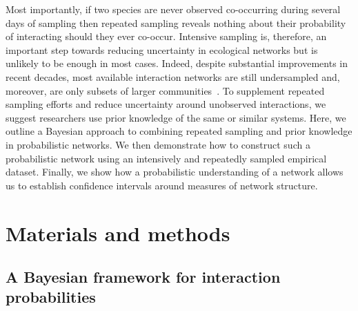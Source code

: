 \documentclass[12pt]{article}
\begin{document}
\begin{spacing}{2.0}
        Most importantly, if two species are never observed co-occurring during several days of sampling then repeated sampling reveals nothing about their probability of interacting should they ever co-occur. Intensive sampling is, therefore, an important step towards reducing uncertainty in ecological networks but is unlikely to be enough in most cases. 
        Indeed, despite substantial improvements in recent decades, most available interaction networks are still undersampled and, moreover, are only subsets of larger communities~\citep{Jordano2016}.
        To supplement repeated sampling efforts and reduce uncertainty around unobserved interactions, we suggest researchers use prior knowledge of the same or similar systems. Here, we outline a Bayesian approach to combining repeated sampling and prior knowledge in probabilistic networks. We then demonstrate how to construct such a probabilistic network using an intensively and repeatedly sampled empirical dataset. Finally, we show how a probabilistic understanding of a network allows us to establish confidence intervals around measures of network structure.


\section*{Materials and methods}

  \subsection*{A Bayesian framework for interaction probabilities}







\end{spacing}
\end{document}
